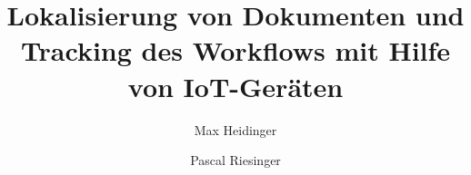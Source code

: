 \usepackage{ifthen}

\usepackage{titling}         %

\author{Max Heidinger \and Pascal Riesinger}

\title{Lokalisierung von Dokumenten und Tracking des Workflows mit Hilfe von IoT-Geräten}

\newcommand{\arbeit}{Studienarbeit}
\newcommand{\studiengang}{Informatik}
\newcommand{\studienjahr}{2017}
\newcommand{\verfassungsort}{Karlsruhe}
\newcommand{\kurs}{TINF17B1}
\newcommand{\bearbeitungsmonat}{Mai 2020}
\newcommand{\abgabe}{24.05.2020}
\newcommand{\bearbeitungszeitraum}{01.10.2019 - 24.05.2020}
\newcommand{\betreuerDhbw}{Prof. Dr. Marcus Strand}


